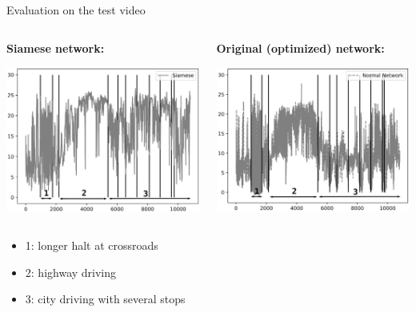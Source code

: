 \begin{frame}{Evaluation on the test video}
	\begin{columns}[c]
		\begin{column}{0.5\textwidth}
			\textbf{Siamese network:}
			\begin{center}
				\includegraphics[width=\textwidth]{imgs/siamese_testvideo.eps}
			\end{center}
		\end{column}
		\begin{column}{0.5\textwidth}
			\textbf{Original (optimized) network:}
			\begin{center}
				\includegraphics[width=\textwidth]{imgs/normal_testvideo.eps}
			\end{center}
		\end{column}
	\end{columns}
	\begin{itemize}
		\item 1: longer halt at crossroads
		\item 2: highway driving
		\item 3: city driving with several stops
	\end{itemize}
\end{frame}

